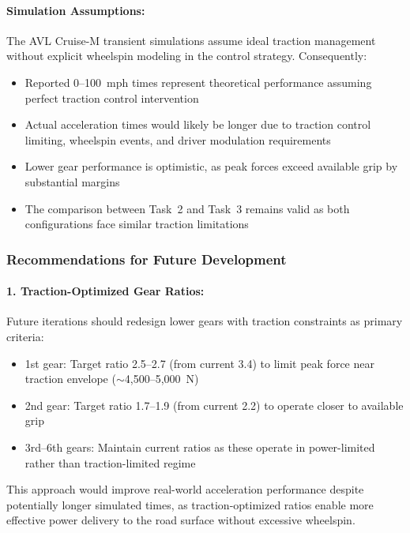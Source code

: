 \paragraph{Simulation Assumptions:}
The AVL Cruise-M transient simulations assume ideal traction management without explicit wheelspin modeling in the control strategy. Consequently:

\begin{itemize}
    \item Reported 0--100~mph times represent theoretical performance assuming perfect traction control intervention
    \item Actual acceleration times would likely be longer due to traction control limiting, wheelspin events, and driver modulation requirements
    \item Lower gear performance is optimistic, as peak forces exceed available grip by substantial margins
    \item The comparison between Task~2 and Task~3 remains valid as both configurations face similar traction limitations
\end{itemize}

\subsubsection{Recommendations for Future Development}

\paragraph{1. Traction-Optimized Gear Ratios:}
Future iterations should redesign lower gears with traction constraints as primary criteria:
\begin{itemize}
    \item 1st gear: Target ratio 2.5--2.7 (from current 3.4) to limit peak force near traction envelope ($\sim$4,500--5,000~N)
    \item 2nd gear: Target ratio 1.7--1.9 (from current 2.2) to operate closer to available grip
    \item 3rd--6th gears: Maintain current ratios as these operate in power-limited rather than traction-limited regime
\end{itemize}

This approach would improve real-world acceleration performance despite potentially longer simulated times, as traction-optimized ratios enable more effective power delivery to the road surface without excessive wheelspin.

